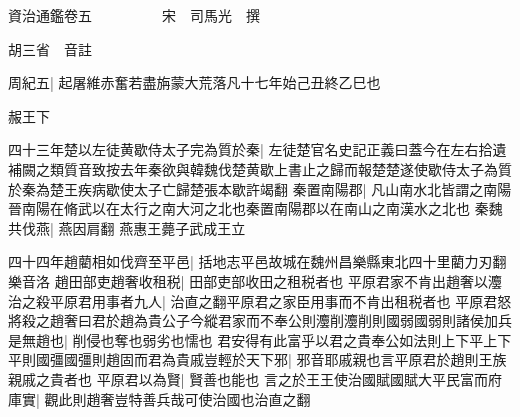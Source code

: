 






























































資治通鑑卷五　　　　　宋　司馬光　撰

胡三省　音註

周紀五|{
	起屠維赤奮若盡旃蒙大荒落凡十七年始己丑終乙巳也}


赧王下

四十三年楚以左徒黄歇侍太子完為質於秦|{
	左徒楚官名史記正義曰蓋今在左右拾遺補闕之類質音致按去年秦欲與韓魏伐楚黄歇上書止之歸而報楚楚遂使歇侍太子為質於秦為楚王疾病歇使太子亡歸楚張本歇許竭翻}
秦置南陽郡|{
	凡山南水北皆謂之南陽晉南陽在脩武以在太行之南大河之北也秦置南陽郡以在南山之南漢水之北也}
秦魏共伐燕|{
	燕因肩翻}
燕惠王薨子武成王立

四十四年趙藺相如伐齊至平邑|{
	括地志平邑故城在魏州昌樂縣東北四十里藺力刃翻樂音洛}
趙田部吏趙奢收租税|{
	田部吏部收田之租税者也}
平原君家不肯出趙奢以灋治之殺平原君用事者九人|{
	治直之翻平原君之家臣用事而不肯出租税者也}
平原君怒將殺之趙奢曰君於趙為貴公子今縱君家而不奉公則灋削灋削則國弱國弱則諸侯加兵是無趙也|{
	削侵也奪也弱劣也懦也}
君安得有此富乎以君之貴奉公如法則上下平上下平則國彊國彊則趙固而君為貴戚豈輕於天下邪|{
	邪音耶戚親也言平原君於趙則王族親戚之貴者也}
平原君以為賢|{
	賢善也能也}
言之於王王使治國賦國賦大平民富而府庫實|{
	觀此則趙奢豈特善兵哉可使治國也治直之翻}


